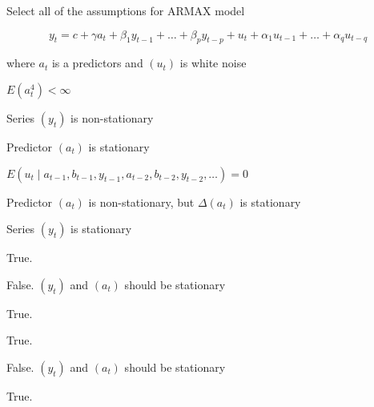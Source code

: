 
\begin{question}
Select all of the assumptions for ARMAX model

\[y_t = c + \gamma a_t +  \beta_1 y_{t-1} + \ldots + \beta_p y_{t-p}  + u_t + \alpha_1 u_{t-1} + \ldots + \alpha_q u_{t-q }\]

where \(a_t\) is a predictors and \((u_t)\) is white noise
\begin{answerlist}
  \item \(E(a^4_t) < \infty\)
  \item Series \((y_t)\) is non-stationary
  \item Predictor \((a_t)\) is stationary
  \item \(E(u_t \mid a_{t-1}, b_{t-1}, y_{t-1}, a_{t-2}, b_{t-2}, y_{t-2} , \ldots) = 0\)
  \item Predictor \((a_t)\) is non-stationary, but \(\Delta(a_t)\) is stationary
  \item Series \((y_t)\) is stationary
\end{answerlist}
\end{question}

\begin{solution}
\begin{answerlist}
  \item True.
  \item False. \((y_t)\) and \((a_t)\) should be stationary
  \item True.
  \item True.
  \item False. \((y_t)\) and \((a_t)\) should be stationary
  \item True.
\end{answerlist}
\end{solution}

